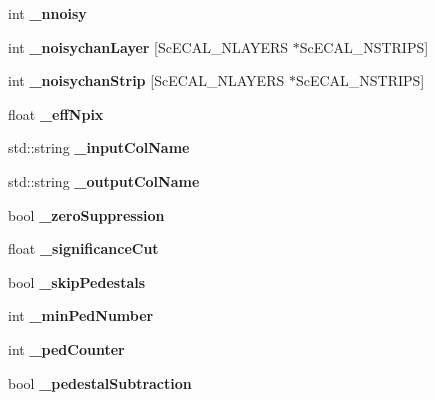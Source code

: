 \begin{DoxyCompactItemize}
\item 
int {\bfseries \_\-nnoisy}\label{classCALICE_1_1IntegratedScECALCalibrationProcessor_a9ce2884633802f471e62c13483ced0a2}

\item 
int {\bfseries \_\-noisychanLayer} [ScECAL\_\-NLAYERS $\ast$ScECAL\_\-NSTRIPS]\label{classCALICE_1_1IntegratedScECALCalibrationProcessor_aadbc356c230573212c8c1e9f9f3f41cc}

\item 
int {\bfseries \_\-noisychanStrip} [ScECAL\_\-NLAYERS $\ast$ScECAL\_\-NSTRIPS]\label{classCALICE_1_1IntegratedScECALCalibrationProcessor_ad5fb35024421a55936030f4f7469fbd7}

\item 
float {\bfseries \_\-effNpix}\label{classCALICE_1_1IntegratedScECALCalibrationProcessor_afede1e6bc146049a6553c9801fe839dd}

\item 
std::string {\bfseries \_\-inputColName}\label{classCALICE_1_1IntegratedScECALCalibrationProcessor_ac42a0277e9b4dc421591e8d3df6e76c4}

\item 
std::string {\bfseries \_\-outputColName}\label{classCALICE_1_1IntegratedScECALCalibrationProcessor_afc10b206d4c70c3254ee8db9c7983e8f}

\item 
bool {\bfseries \_\-zeroSuppression}\label{classCALICE_1_1IntegratedScECALCalibrationProcessor_a3bc7d6f1828510d0a9588f23f8c201eb}

\item 
float {\bfseries \_\-significanceCut}\label{classCALICE_1_1IntegratedScECALCalibrationProcessor_a30185444af319ee6da502b64817e82f6}

\item 
bool {\bfseries \_\-skipPedestals}\label{classCALICE_1_1IntegratedScECALCalibrationProcessor_a78af7130e141695755c6e3448ca73283}

\item 
int {\bfseries \_\-minPedNumber}\label{classCALICE_1_1IntegratedScECALCalibrationProcessor_a1a2f99e38ea563324ffbeff1f342848b}

\item 
int {\bfseries \_\-pedCounter}\label{classCALICE_1_1IntegratedScECALCalibrationProcessor_ad2e2dfb9ed38a0fb477e49422affe3db}

\item 
bool {\bfseries \_\-pedestalSubtraction}\label{classCALICE_1_1IntegratedScECALCalibrationProcessor_abb28167c1947ecb2fa63693acb5088a7}


\end{DoxyCompactItemize}
